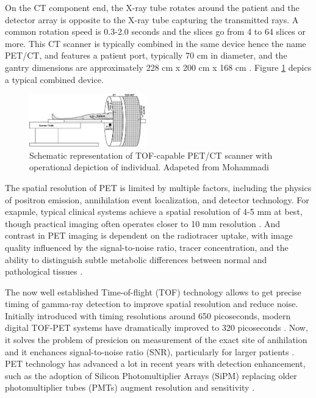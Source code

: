\begin{multicols}{2}
	
On the CT component end, the X-ray tube rotates around the patient and the detector array is opposite to the X-ray tube capturing the transmitted rays. A common rotation speed is 0.3-2.0 seconds and the slices go from 4 to 64 slices or more. This CT scanner is typically combined in the same device hence the name PET/CT, and features a patient port, typically 70 cm in diameter, and the gantry dimensions are approximately 228 cm x 200 cm x 168 cm \cite{Townsend2008}. Figure \ref{fig:PETCTtable} depics a typical combined device.

\begin{figure}[H]
	\centering
	\includegraphics[width=0.45\textwidth]{assets/PETCTtable.jpg} 
	\caption{Schematic representation of TOF-capable PET/CT scanner with operational depiction of individual. Adapeted from Mohammadi \cite{figPETCT}}
	\label{fig:PETCTtable} 
\end{figure}

The spatial resolution of PET is limited by multiple factors, including the physics of positron emission, annihilation event localization, and detector technology. For exapmle, typical clinical systems achieve a spatial resolution of 4-5 mm at best, though practical imaging often operates closer to 10 mm resolution \cite{Wang2018}. And contrast in PET imaging is dependent on the radiotracer uptake, with image quality influenced by the signal-to-noise ratio, tracer concentration, and the ability to distinguish subtle metabolic differences between normal and pathological tissues \cite{Moses2011}.

The now well established Time-of-flight (TOF) technology allows to get precise timing of gamma-ray detection to improve spatial resolution and reduce noise. Initially introduced with timing resolutions around 650 picoseconds, modern digital TOF-PET systems have dramatically improved to 320 picoseconds \cite{Walrand2018}. Now, it solves the problem of presicion on measurement of the exact site of anihilation and it enchances signal-to-noise ratio (SNR), particularly for larger patients \cite{Seifert2022}. PET technology has advanced a lot in recent years with detection enhancement, such as the adoption of Silicon Photomultiplier Arrays (SiPM) replacing older photomultiplier tubes (PMTs) augment resolution and sensitivity \cite{SunderlandSeminar}.


\end{multicols}
